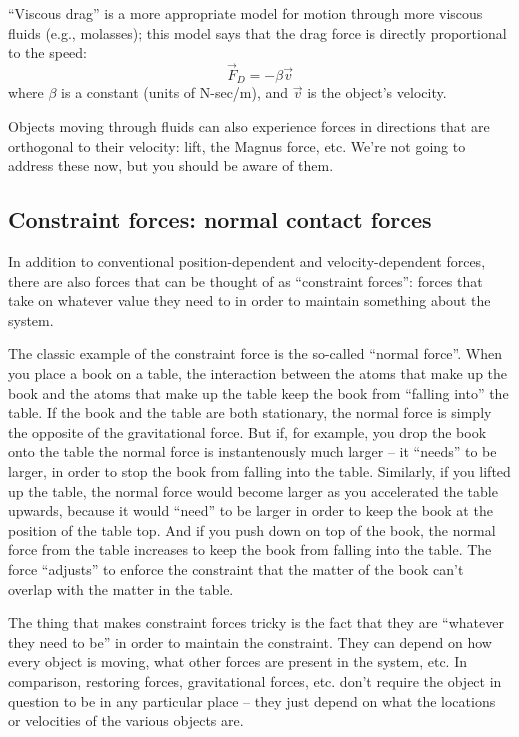 ``Viscous drag'' is a more appropriate model for motion through more viscous fluids (e.g., molasses); this model says that the drag force is directly proportional to the speed:
$$\vec{F}_{D} = -\beta \vec{v}$$
where $\beta$ is a constant (units of N-sec/m), and $\vec{v}$ is the object's velocity.

Objects moving through fluids can also experience forces in directions that are orthogonal to their velocity: lift, the Magnus force, etc.  We're not going to address these now, but you should be aware of them.

\subsection{Constraint forces: normal contact forces}

In addition to conventional position-dependent and velocity-dependent forces, there are also forces that can be thought of as ``constraint forces'': forces that take on whatever value they need to in order to maintain something about the system.  

The classic example of the constraint force is the so-called ``normal force''.  When you place a book on a table, the interaction between the atoms that make up the book and the atoms that make up the table keep the book from ``falling into'' the table.  
If the book and the table are both stationary, the normal force is simply the opposite of the gravitational force.  But if, for example, you drop the book onto the table the normal force is instantenously much larger -- it ``needs'' to be larger, in order to stop the book from falling into the table.  Similarly, if you lifted up the table, the normal force would become larger as you accelerated the table upwards, because it would ``need'' to be larger in order to keep the book at the position of the table top.  And if you push down on top of the book, the normal force from the table increases to keep the book from falling into the table.  The force ``adjusts'' to enforce the constraint that the matter of the book can't overlap with the matter in the table.

The thing that makes constraint forces tricky is the fact that they are ``whatever they need to be'' in order to maintain the constraint.  They can depend on how every object is moving, what other forces are present in the system, etc.  In comparison, restoring forces, gravitational forces, etc. don't require the object in question to be in any particular place -- they just depend on what the locations or velocities of the various objects are.

